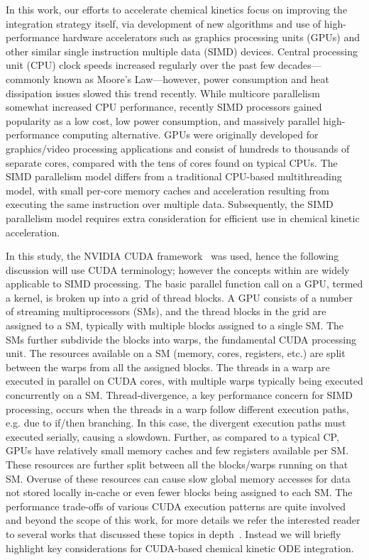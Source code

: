 \documentclass[final,twocolumn]{elsarticle}
\begin{document}
In this work, our efforts to accelerate chemical kinetics focus on improving the integration strategy itself, via development of new algorithms and use of high-performance hardware accelerators such as graphics processing units (GPUs) and other similar single instruction multiple data (SIMD) devices.
Central processing unit (CPU) clock speeds increased regularly over the past few decades---commonly known as Moore's Law---however, power consumption and heat dissipation issues slowed this trend recently.
While multicore parallelism somewhat increased CPU performance, recently SIMD processors gained popularity as a low cost, low power consumption, and massively parallel high-performance computing alternative.
GPUs were originally developed for graphics\slash video processing applications and consist of hundreds to thousands of separate cores, compared with the tens of cores found on typical CPUs.
The SIMD parallelism model differs from a traditional CPU-based multithreading model, with small per-core memory caches and acceleration resulting from executing the same instruction over multiple data.
Subsequently, the SIMD parallelism model requires extra consideration for efficient use in chemical kinetic acceleration.

In this study, the NVIDIA CUDA framework~\cite{Buck:2008aa,NVIDIA:2015aa} was used, hence the following discussion will use CUDA terminology; however the concepts within are widely applicable to SIMD processing.
The basic parallel function call on a GPU, termed a kernel, is broken up into a grid of thread blocks.
A GPU consists of a number of streaming multiprocessors (SMs), and the thread blocks in the grid are assigned to a SM, typically with multiple blocks assigned to a single SM.
The SMs further subdivide the blocks into warps, the fundamental CUDA processing unit.
The resources available on a SM (memory, cores, registers, etc.) are split between the warps from all the assigned blocks.
The threads in a warp are executed in parallel on CUDA cores, with multiple warps typically being executed concurrently on a SM.
Thread-divergence, a key performance concern for SIMD processing, occurs when the threads in a warp follow different execution paths, e.g. due to if\slash then branching.
In this case, the divergent execution paths must executed serially, causing a slowdown.
Further, as compared to a typical CP, GPUs have relatively small memory caches and few registers available per SM.
These resources are further split between all the blocks\slash warps running on that SM.
Overuse of these resources can cause slow global memory accesses for data not stored locally in-cache or even fewer blocks being assigned to each SM.
The performance trade-offs of various CUDA execution patterns are quite involved and beyond the scope of this work, for more details we refer the interested reader to several works that discussed these topics in depth~\cite{Cruz:2011gc,Brodtkorb:2013hn,Niemeyer:2014hn}.
Instead we will briefly highlight key considerations for CUDA-based chemical kinetic ODE integration.
\end{document}
